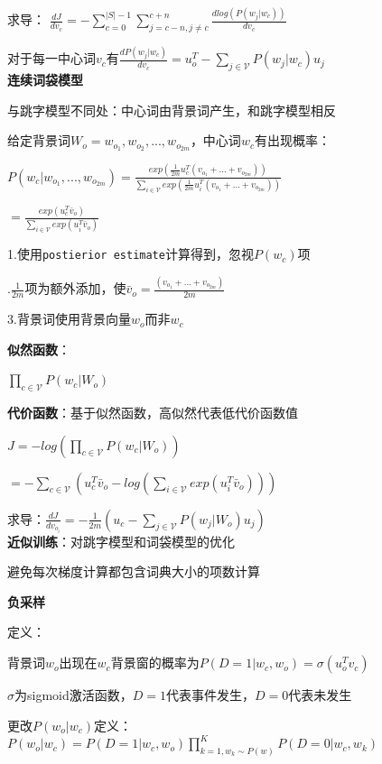 \documentclass[UTF8]{ctexart}
\begin{document}
  \quad 求导： $\frac{d J}{d v_c} = -\sum_{c = 0}^{|S|-1} \sum_{j = c-n, j \neq c}^{c+n} \frac{d log(P(w_j | w_c))}{d v_c}$

  \quad \quad 对于每一中心词$v_c$有$\frac{d P(w_j | w_c)}{d v_c} = u_o^T - \sum_{j\in\mathcal{V}}P(w_j | w_c)u_j$\\
\textbf{连续词袋模型}

  与跳字模型不同处：中心词由背景词产生，和跳字模型相反

  给定背景词$W_o = w_{o_1}, w_{o_2}, ..., w_{o_{2m}}$，中心词$w_c$有出现概率：
  
  \quad $P(w_c | w_{o_1}, ..., w_{o_{2m}}) = \frac{exp(\frac{1}{2m}u_c^T(v_{o_1} + ... + v_{o_{2m}}))}{\sum_{i\in \mathcal{V} } exp(\frac{1}{2m}u_i^T(v_{o_1} + ... + v_{o_{2m}}))}$

  \quad \quad $= \frac{exp(u_c^T\bar{v}_o)}{\sum_{i\in \mathcal{V} } exp(u_i^T\bar{v}_o )}$

  \quad 1.使用\texttt{postierior estimate}计算得到，忽视$P(w_c)$项

  .$\frac{1}{2m}$项为额外添加，使$\bar{v}_o = \frac{(v_{o_1} + ... + v_{o_{2m}})}{2m}$

  \quad 3.背景词使用背景向量$w_o$而非$w_c$
  
  \textbf{似然函数}：

  \quad $\prod_{c \in \mathcal{V} } P(w_c | W_o)$

  \textbf{代价函数}：基于似然函数，高似然代表低代价函数值

  \quad $J = -log(\prod_{c \in \mathcal{V} } P(w_c | W_o))$

  \quad \quad $= -\sum_{c \in \mathcal{V} } (u_c^T\bar{v}_o - log(\sum_{i\in \mathcal{V} } exp(u_i^T\bar{v}_o )))$

  \quad 求导：$\frac{d J}{d v_{o_i}} = -\frac{1}{2m}(u_c - \sum_{j \in \mathcal{V} }P(w_j | W_o)u_j)$\\
\textbf{近似训练}：对跳字模型和词袋模型的优化

  避免每次梯度计算都包含词典大小的项数计算

  \textbf{负采样}

  \quad 定义：

  \quad \quad 背景词$w_o$出现在$w_c$背景窗的概率为$P(D = 1|w_c, w_o) = \sigma(u_o^Tv_c)$

  \quad \quad \quad $\sigma$为sigmoid激活函数，$D = 1$代表事件发生，$D = 0$代表未发生

  \quad 更改$P(w_o | w_c)$定义：$P(w_o | w_c) = P(D = 1| w_c, w_o)\prod_{k=1, w_k \sim P(w)}^{K}P(D = 0 | w_c, w_k)$
\end{document}
